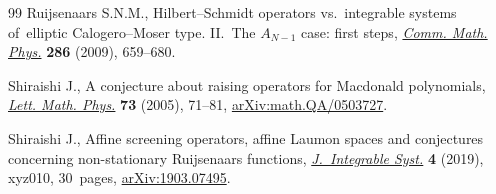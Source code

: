 \documentclass[pdftex]{sigma}%
\numberwithin{equation}{section}
\begin{document}
\begin{thebibliography}{99}
Ruijsenaars S.N.M., Hilbert--{S}chmidt operators vs.\ integrable systems of~elliptic {C}alogero--{M}oser type. {II}.~{T}he {$A_{N-1}$} case: first steps,
 \href{https://doi.org/10.1007/s00220-008-0708-x}{\textit{Comm. Math. Phys.}} \textbf{286} (2009), 659--680.

Shiraishi J., A conjecture about raising operators for {M}acdonald polynomials,
 \href{https://doi.org/10.1007/s11005-005-7648-6}{\textit{Lett. Math. Phys.}} \textbf{73} (2005), 71--81,
 \href{https://arxiv.org/abs/math.QA/0503727}{arXiv:math.QA/0503727}.

Shiraishi J., Affine screening operators, affine {L}aumon spaces and
 conjectures concerning non-stationary {R}uijsenaars functions,
 \href{https://doi.org/10.1093/integr/xyz010}{\textit{J.~Integrable Syst.}} \textbf{4} (2019), xyz010, 30~pages,
 \href{https://arxiv.org/abs/#2}{arXiv:1903.07495}.

\end{thebibliography}\LastPageEnding
\end{document}
